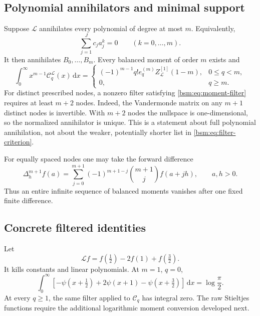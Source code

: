 \documentclass[11pt,letterpaper]{article}
\numberwithin{equation}{section}
\theoremstyle{definition}\newtheorem{definition}[theorem]{Definition}
\theoremstyle{remark}\newtheorem{remark}[theorem]{Remark}
\newcommand{\dd}{\,\mathrm{d}}
\newcommand{\Ccal}{\mathcal C}
\newcommand{\Lcal}{\mathcal L}
\begin{document}
\subsection{Polynomial annihilators and minimal support}
Suppose $\Lcal$ annihilates every polynomial of degree at most $m$.
Equivalently,
\begin{equation}\label{bsm:eq:moment-filter}
 \sum_{j=1}^Jc_ja_j^k=0\qquad(k=0,\ldots,m).
\end{equation}
It then annihilates $B_0,\ldots,B_m$. Every balanced moment of order
$m$ exists and
\begin{equation}\label{bsm:eq:universal-filter}
 \int_0^\infty x^{m-1}\Ccal_q^{\Lcal}(x)\dd x=
 \begin{cases}
 (-1)^{m-1}q!e_q^{(m)}Z_{\Lcal}^{[1]}(1-m),&0\le q<m,\\
 0,&q\ge m.
 \end{cases}
\end{equation}
For distinct prescribed nodes, a nonzero filter satisfying
\eqref{bsm:eq:moment-filter} requires at least $m+2$ nodes. Indeed, the
Vandermonde matrix on any $m+1$ distinct nodes is invertible. With
$m+2$ nodes the nullspace is one-dimensional, so the normalized
annihilator is unique. This is a statement about full polynomial
annihilation, not about the weaker, potentially shorter list in
\eqref{bsm:eq:filter-criterion}.

For equally spaced nodes one may take the forward difference
\begin{equation}\label{bsm:eq:forward}
 \Delta_h^{m+1}f(a)=
 \sum_{j=0}^{m+1}(-1)^{m+1-j}\binom{m+1}{j}f(a+jh),
 \qquad a,h>0.
\end{equation}
Thus an entire infinite sequence of balanced moments vanishes after
one fixed finite difference.

\subsection{Concrete filtered identities}
Let
\begin{equation}\label{bsm:eq:half-filter}
 \Lcal f=f(\tfrac12)-2f(1)+f(\tfrac32).
\end{equation}
It kills constants and linear polynomials. At $m=1$, $q=0$,
\begin{equation}\label{bsm:eq:filtered-gamma0}
 \int_0^\infty\left[-\psi(x+\tfrac12)+2\psi(x+1)
                       -\psi(x+\tfrac32)\right]\dd x
             =\log\frac\pi2.
\end{equation}
At every $q\ge1$, the same filter applied to $\Ccal_q$ has integral
zero. The raw Stieltjes functions require the additional logarithmic
moment conversion developed next.
\end{document}
